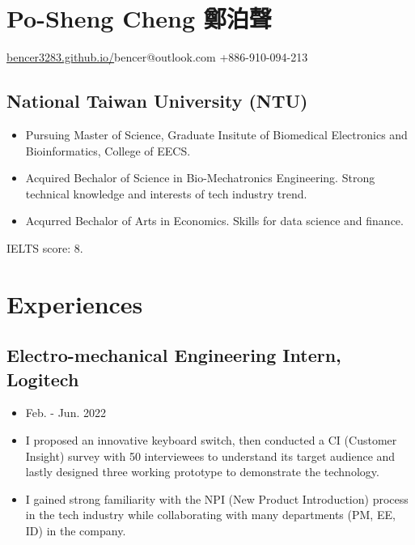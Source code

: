 \documentclass[12pt]{article}
\begin{document}
    \section*{Po-Sheng Cheng \quad 鄭泊聲} 
    {\sffamily \href{https://bencer3283.github.io}{\underline{bencer3283.github.io/}}\quad bencer@outlook.com \quad +886-910-094-213}
    \newline
    \subsection*{National Taiwan University (NTU)} 
    {\sffamily
    \begin{itemize}
        \item Pursuing Master of Science, Graduate Insitute of Biomedical Electronics and Bioinformatics, College of EECS.
        \item Acquired Bechalor of Science in Bio-Mechatronics Engineering. Strong technical knowledge and interests of tech industry trend.
        \item Acqurred Bechalor of Arts in Economics. Skills for data science and finance.
    \end{itemize}
    IELTS score: 8.}

    \section*{Experiences
    }
    
        \subsection*{Electro-mechanical Engineering Intern, Logitech}
        {\sffamily
        \begin{itemize}
            \item Feb. - Jun. 2022
            \item I proposed an innovative keyboard switch, then conducted a CI (Customer Insight) survey with 50 interviewees to understand its target audience and lastly designed three working prototype to demonstrate the technology.
            \item I gained strong familiarity with the NPI (New Product Introduction) process in the tech industry while collaborating with many departments (PM, EE, ID) in the company.
        \end{itemize}
        }
\end{document}
